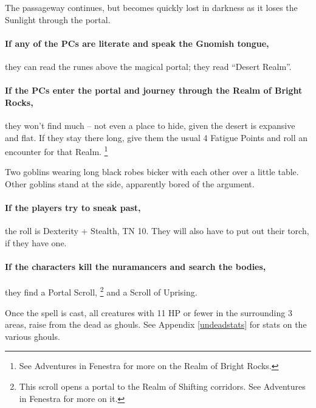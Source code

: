 \begin{multicols}{2}
\begin{boxtext}
	The passageway continues, but becomes quickly lost in darkness as it loses the Sunlight through the portal.

\end{boxtext}

\paragraph{If any of the PCs are literate and speak the Gnomish tongue,}
they can read the runes above the magical portal; they read ``Desert Realm''.

\paragraph{If the PCs enter the portal and journey through the Realm of Bright Rocks,}
they won't find much -- not even a place to hide, given the desert is expansive and flat.
If they stay there long, give them the usual 4 Fatigue Points and roll an encounter for that Realm.%
\footnote{See Adventures in Fenestra for more on the Realm of Bright Rocks.}


\begin{boxtext}

	Two goblins wearing long black robes bicker with each other over a little table.
	Other goblins stand at the side, apparently bored of the argument.

\end{boxtext}

\paragraph{If the players try to sneak past,}
the roll is Dexterity + Stealth, TN 10.
They will also have to put out their torch, if they have one.

\paragraph{If the characters kill the nuramancers and search the bodies,}
they find a Portal Scroll,%
\footnote{This scroll opens a portal to the Realm of Shifting corridors. See Adventures in Fenestra for more on it.}%
 and a Scroll of Uprising.


Once the spell is cast, all creatures with 11 HP or fewer in the surrounding 3 areas, raise from the dead as ghouls.
See Appendix \ref{undeadstats} for stats on the various ghouls.


\end{multicols}

